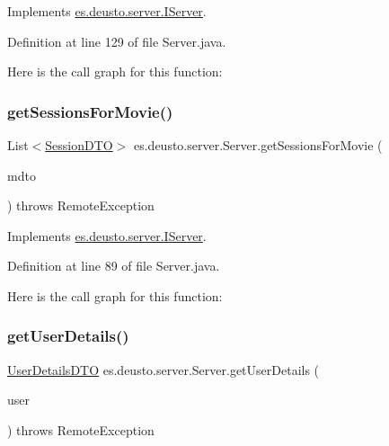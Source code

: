 Implements \mbox{\hyperlink{interfacees_1_1deusto_1_1server_1_1_i_server_aac50d6a77e30df4d4c15fcaf4ba979f5}{es.\+deusto.\+server.\+I\+Server}}.



Definition at line 129 of file Server.\+java.

Here is the call graph for this function\+:
\mbox{\label{classes_1_1deusto_1_1server_1_1_server_a33a6671bb4dc4bd9e23df10e53e5632d}} 
\subsubsection{\texorpdfstring{getSessionsForMovie()}{getSessionsForMovie()}}
{\footnotesize\ttfamily List$<$\mbox{\hyperlink{classes_1_1deusto_1_1server_1_1data_1_1_session_d_t_o}{Session\+D\+TO}}$>$ es.\+deusto.\+server.\+Server.\+get\+Sessions\+For\+Movie (\begin{DoxyParamCaption}\item[{\mbox{\hyperlink{classes_1_1deusto_1_1server_1_1data_1_1_movie_d_t_o}{Movie\+D\+TO}}}]{mdto }\end{DoxyParamCaption}) throws Remote\+Exception}



Implements \mbox{\hyperlink{interfacees_1_1deusto_1_1server_1_1_i_server_a33dc65de2a567be10bf2477ee28765f8}{es.\+deusto.\+server.\+I\+Server}}.



Definition at line 89 of file Server.\+java.

Here is the call graph for this function\+:
\mbox{\label{classes_1_1deusto_1_1server_1_1_server_ad742fe9a45edccd8b2309be98a74baae}} 
\subsubsection{\texorpdfstring{getUserDetails()}{getUserDetails()}}
{\footnotesize\ttfamily \mbox{\hyperlink{classes_1_1deusto_1_1server_1_1data_1_1_user_details_d_t_o}{User\+Details\+D\+TO}} es.\+deusto.\+server.\+Server.\+get\+User\+Details (\begin{DoxyParamCaption}\item[{\mbox{\hyperlink{classes_1_1deusto_1_1server_1_1data_1_1_user_d_t_o}{User\+D\+TO}}}]{user }\end{DoxyParamCaption}) throws Remote\+Exception}



